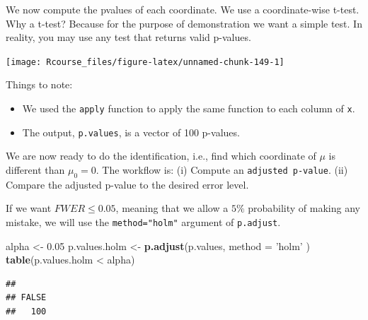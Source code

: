 \documentclass[]{book}
\newenvironment{Shaded}{\begin{snugshade}}{\end{snugshade}}
\newcommand{\KeywordTok}[1]{\textcolor[rgb]{0.13,0.29,0.53}{\textbf{{#1}}}}
\newcommand{\DataTypeTok}[1]{\textcolor[rgb]{0.13,0.29,0.53}{{#1}}}
\newcommand{\DecValTok}[1]{\textcolor[rgb]{0.00,0.00,0.81}{{#1}}}
\newcommand{\FloatTok}[1]{\textcolor[rgb]{0.00,0.00,0.81}{{#1}}}
\newcommand{\StringTok}[1]{\textcolor[rgb]{0.31,0.60,0.02}{{#1}}}
\newcommand{\NormalTok}[1]{{#1}}
\providecommand{\tightlist}{%
  \setlength{\itemsep}{0pt}\setlength{\parskip}{0pt}}
\theoremstyle{definition}
\theoremstyle{definition}
\theoremstyle{remark}
\begin{document}
We now compute the pvalues of each coordinate. We use a coordinate-wise
t-test. Why a t-test? Because for the purpose of demonstration we want a
simple test. In reality, you may use any test that returns valid
p-values.

\begin{Shaded}
\end{Shaded}

\texttt{[image: Rcourse\_files/figure-latex/unnamed-chunk-149-1]}

Things to note:

\begin{itemize}
\tightlist
\item
  We used the \texttt{apply} function to apply the same function to each
  column of \texttt{x}.
\item
  The output, \texttt{p.values}, is a vector of 100 p-values.
\end{itemize}

We are now ready to do the identification, i.e., find which coordinate
of \(\mu\) is different than \(\mu_0=0\). The workflow is: (i) Compute
an \texttt{adjusted\ p-value}. (ii) Compare the adjusted p-value to the
desired error level.

If we want \(FWER \leq 0.05\), meaning that we allow a \(5\%\)
probability of making any mistake, we will use the
\texttt{method="holm"} argument of \texttt{p.adjust}.

\begin{Shaded}
\begin{Highlighting}[]
\NormalTok{alpha <-}\StringTok{ }\FloatTok{0.05}
\NormalTok{p.values.holm <-}\StringTok{ }\KeywordTok{p.adjust}\NormalTok{(p.values, }\DataTypeTok{method =} \StringTok{'holm'} \NormalTok{)}
\KeywordTok{table}\NormalTok{(p.values.holm <}\StringTok{ }\NormalTok{alpha)}
\end{Highlighting}
\end{Shaded}

\begin{verbatim}
## 
## FALSE 
##   100
\end{verbatim}
\end{document}
